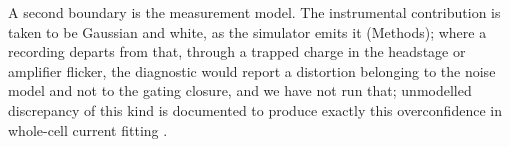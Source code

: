 A second boundary is the measurement model. The instrumental contribution is taken to be Gaussian and white, as the simulator emits it (Methods); where a recording departs from that, through a trapped charge in the headstage or amplifier flicker, the diagnostic would report a distortion belonging to the noise model and not to the gating closure, and we have not run that; unmodelled discrepancy of this kind is documented to produce exactly this overconfidence in whole-cell current fitting \citep{lei2020considering}.


